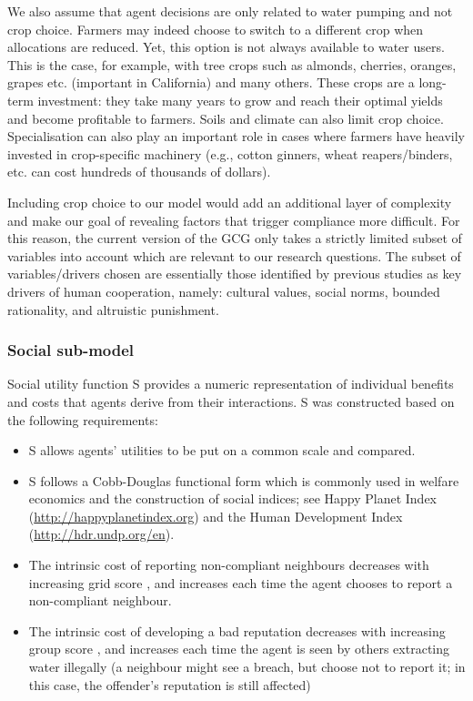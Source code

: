 \documentclass[12pt, a4paper]{article}
\begin{document}
We also assume that agent decisions are only related to water pumping and not crop choice. Farmers may indeed choose to switch to a different crop when allocations are reduced. Yet, this option is not always available to water users. This is the case, for example, with tree crops such as almonds, cherries, oranges, grapes etc. (important in California) and many others. These crops are a long-term investment: they take many years to grow and reach their optimal yields and become profitable to farmers. Soils and climate can also limit crop choice. Specialisation can also play an important role in cases where farmers have heavily invested in crop-specific machinery (e.g., cotton ginners, wheat reapers/binders, etc. can cost hundreds of thousands of dollars). 

Including crop choice to our model would add an additional layer of complexity and make our goal of revealing factors that trigger compliance more difficult. For this reason, the current version of the GCG only takes a strictly limited subset of variables into account which are relevant to our research questions. The subset of variables/drivers chosen are essentially those identified by previous studies as key drivers of human cooperation\autocite{Axelrod:1986vx, Ostrom:2000cd, Gigerenzer:2002tn, Nowak:2006bt}, namely: cultural values, social norms, bounded rationality, and altruistic punishment.

\subsubsection{Social sub-model}

Social utility function S provides a numeric representation of individual benefits and costs that agents derive from their interactions. S was constructed based on the following requirements:

\begin{itemize}
\item S allows agents’ utilities to be put on a common scale and compared.
\item S follows a Cobb-Douglas functional form which is commonly used in welfare economics and the construction of social indices; see Happy Planet Index (\url{http://happyplanetindex.org}) and the Human Development Index (\url{http://hdr.undp.org/en}).
\item The intrinsic cost of reporting non-compliant neighbours decreases with increasing grid score \autocite{Chai:2009vz}, and increases each time the agent chooses to report a non-compliant neighbour.

\item The intrinsic cost of developing a bad reputation decreases with increasing group score \autocite{Chai:2009vz}, and increases each time the agent is seen by others extracting water illegally (a neighbour might see a breach, but choose not to report it; in this case, the offender’s reputation is still affected) \end{itemize}
\end{document}
